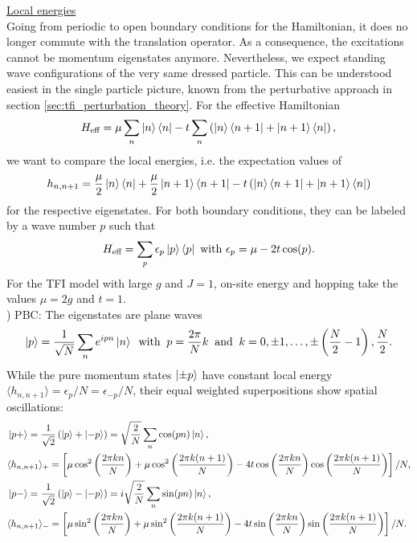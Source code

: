 \noindent \underline{Local energies} \\[0.5em]
Going from periodic to open boundary conditions for the Hamiltonian, it does no longer commute with the translation operator. As a consequence, the excitations cannot be momentum eigenstates anymore. Nevertheless, we expect standing wave configurations of the very same dressed particle. 
This can be understood easiest in the single particle picture, known from the perturbative approach in section \ref{sec:tfi_perturbation_theory}. For the effective Hamiltonian 
\begin{equation}
	H_{\text{eff}} =  \mu \sum_n \ket{n} \bra{n} - t \sum_n \left( \ket{n} \bra{n+1} + \ket{n+1} \bra{n} \right),
\end{equation}
we want to compare the local energies, i.e. the expectation values of
\begin{equation}
	h_{n, n+1} =  \frac{\mu}{2} \ket{n} \bra{n} + \frac{\mu}{2} \ket{n+1} \bra{n+1} - t \left( \ket{n} \bra{n+1} + \ket{n+1} \bra{n} \right)
\end{equation}
for the respective eigenstates. For both boundary conditions, they can be labeled by a wave number $p$ such that
\begin{equation}
	H_{\text{eff}} = \sum_p \epsilon_p \ket{p} \bra{p} \text{ with } \epsilon_p =  \mu - 2t \cos(p).
\end{equation}
For the TFI model with large $g$ and $J = 1$, on-site energy and hopping take the values $\mu = 2g$ and $t = 1$. \\[0.5em]
) PBC: The eigenstates are plane waves
\begin{equation}
	\ket{p} = \frac{1}{\sqrt{N}} \sum_n e^{ipn} \ket{n} \: \text{ with }\: p = \frac{2 \pi}{N} k \:\text{ and }\: k = 0, \pm 1, \ldots, \pm \left( \frac{N}{2}-1 \right), \frac{N}{2}.
\end{equation}
While the pure momentum states $\ket{\pm p}$ have constant local energy $\langle h_{n, n+1} \rangle = \epsilon_p / N = \epsilon_{-p} / N$, their equal weighted superpositions show spatial oscillations:
\begin{align*}
	& \ket{p+} = \frac{1}{\sqrt{2}} \left( \ket{p} + \ket{-p} \right) = \sqrt{\frac{2}{N}} \sum_n \cos(pn) \ket{n}, \\
	& \langle h_{n, n+1} \rangle_+ 
	= \left[ 
	\mu \cos^2 \left( \frac{2 \pi k n}{N} \right) 
	+ \mu \cos^2 \left( \frac{2 \pi k (n+1)}{N}  \right) 
	- 4t \cos \left( \frac{2 \pi k n}{N} \right) \cos \left( \frac{2 \pi k(n+1)}{N} \right) 
	\right] / N, \\
	& \ket{p-} = \frac{1}{\sqrt{2}} \left( \ket{p} - \ket{-p} \right) = i\sqrt{\frac{2}{N}} \sum_n \sin(pn) \ket{n}, \\
	& \langle h_{n, n+1} \rangle_- 
	= \left[ 
	\mu \sin^2 \left( \frac{2 \pi k n}{N} \right) 
	+ \mu \sin^2 \left( \frac{2 \pi k (n+1)}{N} \right) 
	- 4t \sin \left( \frac{2 \pi k n}{N} \right) \sin \left( \frac{2 \pi k (n+1)}{N}  \right)
	\right] / N.
\end{align*}

